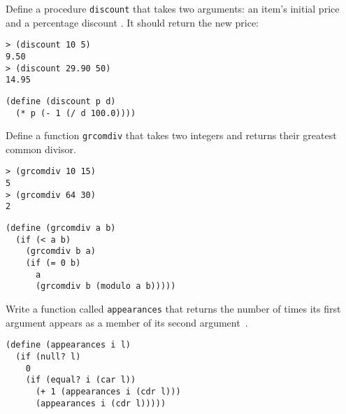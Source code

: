 \documentclass[a4paper, 12pt]{exam}
\begin{document}
\begin{questions}
\begin{solution}
\end{solution}


\question
Define a procedure \texttt{discount} that takes two arguments: an item’s initial price and a percentage discount \cite{simplyscheme}.
It should return the new price:
\begin{verbatim}
> (discount 10 5)
9.50
> (discount 29.90 50)
14.95
\end{verbatim}


\begin{solution}
  \begin{verbatim}
(define (discount p d)
  (* p (- 1 (/ d 100.0))))
  \end{verbatim}
\end{solution}


\question
Define a function \texttt{grcomdiv} that takes two integers and returns their greatest common divisor.
\begin{verbatim}
> (grcomdiv 10 15)
5
> (grcomdiv 64 30)
2
\end{verbatim}


\begin{solution}
  \begin{verbatim}
(define (grcomdiv a b)
  (if (< a b)
    (grcomdiv b a)
    (if (= 0 b)
      a
      (grcomdiv b (modulo a b)))))
  \end{verbatim}
\end{solution}

\question
Write a function called \texttt{appearances} that returns the number of times its first argument appears as a member of its second argument~\cite{simplyscheme}.

\begin{solution}
  \begin{verbatim}
(define (appearances i l)
  (if (null? l)
    0
    (if (equal? i (car l))  
      (+ 1 (appearances i (cdr l)))
      (appearances i (cdr l)))))   
  \end{verbatim}
\end{solution}


\end{questions}
\end{document}

